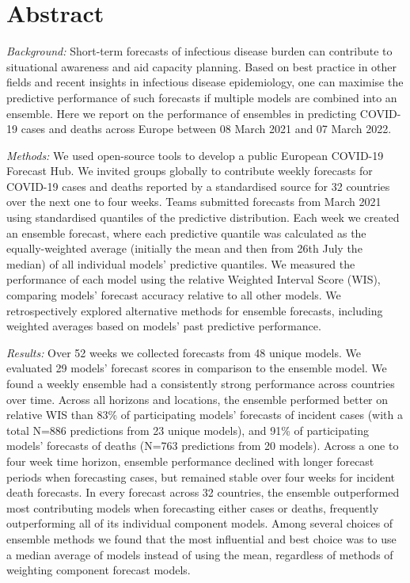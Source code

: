 \documentclass[
]{article}
\begin{document}
\hypertarget{abstract}{%
\section{Abstract}\label{abstract}}

\emph{Background:} Short-term forecasts of infectious disease burden can contribute to situational awareness and aid capacity planning. Based on best practice in other fields and recent insights in infectious disease epidemiology, one can maximise the predictive performance of such forecasts if multiple models are combined into an ensemble. Here we report on the performance of ensembles in predicting COVID-19 cases and deaths across Europe between 08 March 2021 and 07 March 2022.

\emph{Methods:} We used open-source tools to develop a public European COVID-19 Forecast Hub. We invited groups globally to contribute weekly forecasts for COVID-19 cases and deaths reported by a standardised source for 32 countries over the next one to four weeks. Teams submitted forecasts from March 2021 using standardised quantiles of the predictive distribution. Each week we created an ensemble forecast, where each predictive quantile was calculated as the equally-weighted average (initially the mean and then from 26th July the median) of all individual models' predictive quantiles. We measured the performance of each model using the relative Weighted Interval Score (WIS), comparing models' forecast accuracy relative to all other models. We retrospectively explored alternative methods for ensemble forecasts, including weighted averages based on models' past predictive performance.

\emph{Results:} Over 52 weeks we collected forecasts from 48 unique models. We evaluated 29 models' forecast scores in comparison to the ensemble model. We found a weekly ensemble had a consistently strong performance across countries over time. Across all horizons and locations, the ensemble performed better on relative WIS than 83\% of participating models' forecasts of incident cases (with a total N=886 predictions from 23 unique models), and 91\% of participating models' forecasts of deaths (N=763 predictions from 20 models). Across a one to four week time horizon, ensemble performance declined with longer forecast periods when forecasting cases, but remained stable over four weeks for incident death forecasts. In every forecast across 32 countries, the ensemble outperformed most contributing models when forecasting either cases or deaths, frequently outperforming all of its individual component models. Among several choices of ensemble methods we found that the most influential and best choice was to use a median average of models instead of using the mean, regardless of methods of weighting component forecast models.
\end{document}
